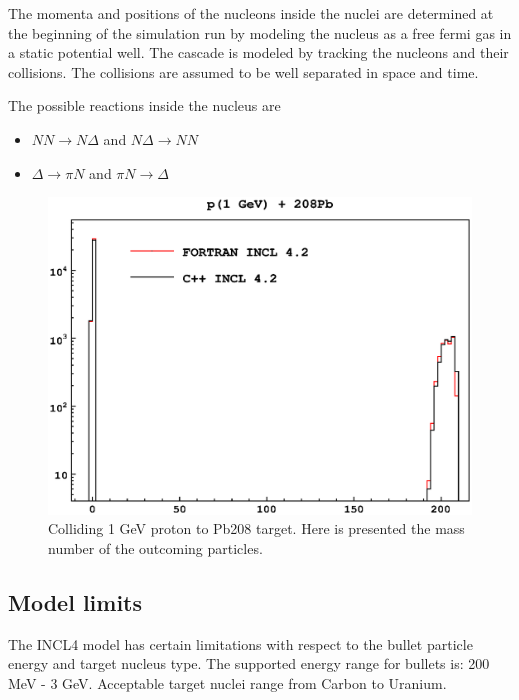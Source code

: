 \documentclass[12pt,a4paper]{article}
\begin{document}
The momenta and positions of the nucleons inside the nuclei are
determined at the beginning of the simulation run by modeling the
nucleus as a free fermi gas in a static potential well. The cascade is
modeled by tracking the nucleons and their collisions. The collisions
are assumed to be well separated in space and time.

The possible reactions inside the nucleus are 
\begin{itemize}
\item $NN \rightarrow N \Delta$ and $N \Delta \rightarrow NN$ 
\item $\Delta \rightarrow \pi N$ and $\pi N \rightarrow \Delta$
\end{itemize}

\begin{figure}[ht]
\begin{center}
\includegraphics[scale=0.6]{Pb208Proton1GeV.eps}
\end{center}
\caption{Colliding 1 GeV proton to Pb208 target. Here is presented the
mass number of the outcoming particles.}
\end{figure}

\subsection{Model limits}

The INCL4 model has certain limitations with respect to the bullet
particle energy and target nucleus type. The supported energy range
for bullets is: 200 MeV - 3 GeV. Acceptable target nuclei range from
Carbon to Uranium.
\end{document}

